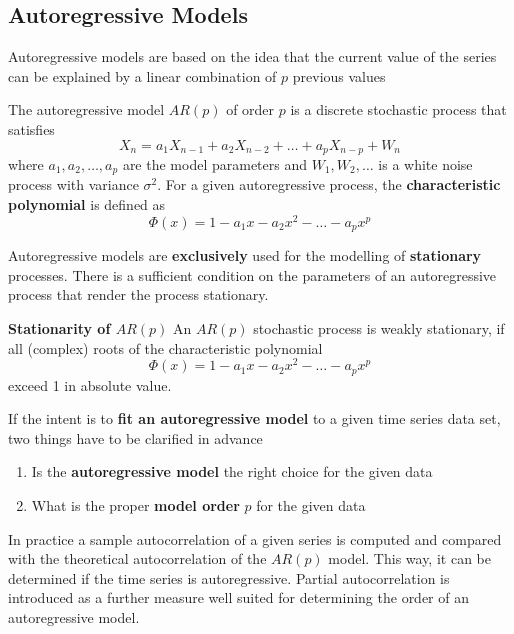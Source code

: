 \documentclass[11pt]{article}
\theoremstyle{definition}
\begin{document}
\subsection{Autoregressive Models}
Autoregressive models are based on the idea that the current value of the series can be explained by a linear combination of $p$ previous values
\begin{definition}
	The autoregressive model $AR(p)$ of order $p$ is a discrete stochastic process that satisfies
	\begin{equation*}
		X_n = a_1 X_{n-1} + a_2 X_{n-2} + \dots + a_p X_{n-p} + W_n
	\end{equation*}
	where $a_1,a_2,\dots,a_p$ are the model parameters and $W_1, W_2, \dots$ is a white noise process with variance $\sigma^2$. For a given autoregressive process, the \textbf{characteristic polynomial} is defined as
	\begin{equation*}
		\Phi(x) = 1 - a_1 x - a_2 x^2 - \dots - a_p x^p
	\end{equation*}
\end{definition}

Autoregressive models are \textbf{exclusively} used for the modelling of \textbf{stationary} processes. There is a sufficient  condition on the parameters of an autoregressive process that render the process stationary.
\begin{definition}
	\textbf{Stationarity of $AR(p)$}
	An $AR(p)$ stochastic process is weakly stationary, if all (complex) roots of the characteristic polynomial
	\begin{equation*}
		\Phi(x) = 1 - a_1 x - a_2 x^2 - \dots - a_p x^p
	\end{equation*}
	exceed 1 in absolute value.
\end{definition}
If the intent is to \textbf{fit an autoregressive model} to a given time series data set, two things have to be clarified in advance
\begin{enumerate}
	\item Is the \textbf{autoregressive model} the right choice for the given data
	\item What is the proper \textbf{model order} $p$ for the given data
\end{enumerate}
In practice a sample autocorrelation of a given series is computed and compared with the theoretical autocorrelation of the $AR(p)$ model. This way, it can be determined if the time series is autoregressive. Partial autocorrelation is introduced as a further measure well suited for determining the order of an autoregressive model.
\end{document}
